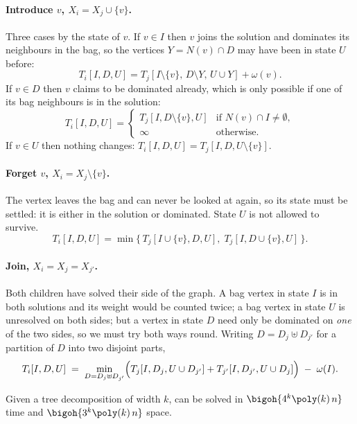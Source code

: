 \paragraph{Introduce $v$, $X_i = X_j \cup \{v\}$.} Three cases by the state of
$v$. If $v \in I$ then $v$ joins the solution and dominates its neighbours in
the bag, so the vertices $Y = N(v) \cap D$ may have been in state $U$ before:
\[ T_i[I,D,U] = T_j[I \setminus \{v\},\, D \setminus Y,\, U \cup Y] +
   \omega(v). \]
If $v \in D$ then $v$ claims to be dominated already, which is only possible if
one of its bag neighbours is in the solution:
\[ T_i[I,D,U] = \begin{cases}
     T_j[I, D \setminus \{v\}, U] & \text{if } N(v) \cap I \ne \emptyset, \\
     \infty & \text{otherwise.}
   \end{cases} \]
If $v \in U$ then nothing changes: $T_i[I,D,U] = T_j[I,D,U \setminus \{v\}]$.

\paragraph{Forget $v$, $X_i = X_j \setminus \{v\}$.} The vertex leaves the bag
and can never be looked at again, so its state must be settled: it is either in
the solution or dominated. State $U$ is not allowed to survive.
\[ T_i[I,D,U] = \min\bigl\{\, T_j[I \cup \{v\}, D, U],\;
                            T_j[I, D \cup \{v\}, U] \,\bigr\}. \]

\paragraph{Join, $X_i = X_j = X_{j'}$.} Both children have solved their side of
the graph. A bag vertex in state $I$ is in both solutions and its weight would
be counted twice; a bag vertex in state $U$ is unresolved on both sides; but a
vertex in state $D$ need only be dominated on \emph{one} of the two sides, so we
must try both ways round. Writing $D = D_j \uplus D_{j'}$ for a partition of $D$
into two disjoint parts,
\[ T_i[I,D,U] \;=\; \min_{D = D_j \uplus D_{j'}}
   \Bigl( T_j[I, D_j, U \cup D_{j'}] + T_{j'}[I, D_{j'}, U \cup D_j] \Bigr)
   \;-\; \omega(I). \]

\begin{theorem}\label{thm:tw-dominating-set}
Given a tree decomposition of width $k$,  can be
solved in $\bigoh{4^k \poly(k)\, n}$ time and $\bigoh{3^k \poly(k)\, n}$ space.
\end{theorem}

